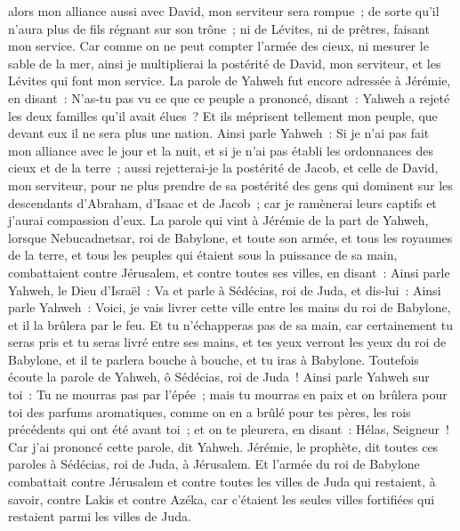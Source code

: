 \begin{multicols}{2}
alors mon alliance aussi avec David, mon serviteur sera rompue~; de sorte qu'il n'aura plus de fils régnant sur son trône~; ni de Lévites, ni de prêtres, faisant mon service.
Car comme on ne peut compter l'armée des cieux, ni mesurer le sable de la mer, ainsi je multiplierai la postérité de David, mon serviteur, et les Lévites qui font mon service.
La parole de Yahweh fut encore adressée à Jérémie, en disant~:
N'as-tu pas vu ce que ce peuple a prononcé, disant~: Yahweh a rejeté les deux familles qu'il avait élues~? Et ils méprisent tellement mon peuple, que devant eux il ne sera plus une nation.
Ainsi parle Yahweh~: Si je n'ai pas fait mon alliance avec le jour et la nuit, et si je n'ai pas établi les ordonnances des cieux et de la terre~;
aussi rejetterai-je la postérité de Jacob, et celle de David, mon serviteur, pour ne plus prendre de sa postérité des gens qui dominent sur les descendants d'Abraham, d'Isaac et de Jacob~; car je ramènerai leurs captifs et j'aurai compassion d'eux.
\VerseOne{}La parole qui vint à Jérémie de la part de Yahweh, lorsque Nebucadnetsar, roi de Babylone, et toute son armée, et tous les royaumes de la terre, et tous les peuples qui étaient sous la puissance de sa main, combattaient contre Jérusalem, et contre toutes ses villes, en disant~:
Ainsi parle Yahweh, le Dieu d'Israël~: Va et parle à Sédécias, roi de Juda, et dis-lui~: Ainsi parle Yahweh~: Voici, je vais livrer cette ville entre les mains du roi de Babylone, et il la brûlera par le feu.
Et tu n'échapperas pas de sa main, car certainement tu seras pris et tu seras livré entre ses mains, et tes yeux verront les yeux du roi de Babylone, et il te parlera bouche à bouche, et tu iras à Babylone.
Toutefois écoute la parole de Yahweh, ô Sédécias, roi de Juda~! Ainsi parle Yahweh sur toi~: Tu ne mourras pas par l'épée~;
mais tu mourras en paix et on brûlera pour toi des parfums aromatiques, comme on en a brûlé pour tes pères, les rois précédents qui ont été avant toi~; et on te pleurera, en disant~: Hélas, Seigneur~! Car j'ai prononcé cette parole, dit Yahweh.
Jérémie, le prophète, dit toutes ces paroles à Sédécias, roi de Juda, à Jérusalem.
Et l'armée du roi de Babylone combattait contre Jérusalem et contre toutes les villes de Juda qui restaient, à savoir, contre Lakis et contre Azéka, car c'étaient les seules villes fortifiées qui restaient parmi les villes de Juda.

\end{multicols}
